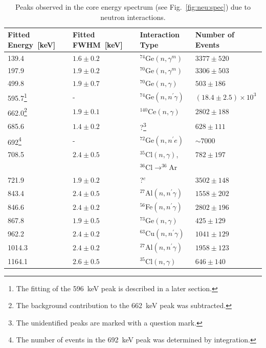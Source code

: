 \begin{table}[tbhp]
  \caption{Peaks observed in the core energy spectrum (see
Fig.~\ref{fig:neu:spec})
    due to neutron interactions.} 
  \label{tab:neu:peak}\centering
  \begin{minipage}{\linewidth}
    \begin{tabular}{llll} \hline
      Fitted Energy~[keV]& Fitted FWHM~[keV]& Interaction Type& Number of Events\\\hline
      139.4 & $1.6 \pm 0.2$ & $^{74}$Ge$(n,\gamma^m)$ & $3377 \pm 520$
\\
      197.9 & $1.9 \pm 0.2$ & $^{70}$Ge$(n,\gamma^m)$ & $3306 \pm 503$
\\
      499.8 & $1.9 \pm 0.7$ & $^{70}$Ge$(n,\gamma)$   & $503  \pm 186$
\\
      595.7\footnote{The fitting of the 596~keV peak is described in a
        later section.}
      & - & $^{74}$Ge$(n,n^\prime\gamma)$ & $(18.4 \pm 2.5)\times10^3$
\\
      662.0\footnote{The background contribution to the 662~keV peak
        was subtracted.}
      & $1.9 \pm 0.1$ & $^{140}$Ce$(n,\gamma)$ & $2802 \pm 188$ \\
      685.6 & $1.4 \pm 0.2$ & ?\footnote{The unidentified peaks are
        marked with a question mark.} & $628  \pm 111$ \\
      692\footnote{The number of events in the 692~keV peak was
        determined by integration.}  & - & $^{72}$Ge$(n,n^\prime e)$ &
      $\sim 7000$
      \\
      708.5  & $2.4 \pm 0.5$ & $^{35}$Cl$(n,\gamma)$,       & $782 
\pm 197$ \\
      &  & $^{36}$Cl$\rightarrow^{36}$Ar & \\
      721.9  & $1.9 \pm 0.2$ & ?$^c$ & $3502 \pm 148$ \\
      843.4  & $2.4 \pm 0.5$ & $^{27}$Al$(n,n^\prime\gamma)$ & $1558
\pm 202$ \\
      846.6  & $2.4 \pm 0.2$ & $^{56}$Fe$(n,n^\prime\gamma)$ & $2802
\pm 196$ \\
      867.8  & $1.9 \pm 0.5$ & $^{73}$Ge$(n,\gamma)$        & $425 
\pm 129$ \\
      962.2  & $2.4 \pm 0.2$ & $^{63}$Cu$(n,n^\prime\gamma)$ & $1041
\pm 129$ \\
      1014.3 & $2.4 \pm 0.2$ & $^{27}$Al$(n,n^\prime\gamma)$ & $1958
\pm 123$ \\
      1164.1 & $2.6 \pm 0.5$ & $^{35}$Cl$(n,\gamma)$        & $646 
\pm 140$ \\

\end{tabular}
\end{minipage}
\end{table}
